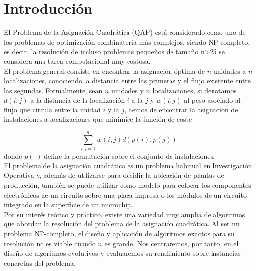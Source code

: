 

\newpage


\section{Introducción}

El Problema de la Asignación Cuadrática (QAP) está considerado como uno de los problemas de optimización combinatoria más complejos, siendo NP-completo, es decir, la resolución de incluso problemas pequeños de tamaño n>25 se considera una tarea computacional muy costosa.\\

El problema general consiste en encontrar la asignación óptima de $n$ unidades a $n$ localizaciones, conociendo la distancia entre las primeras y el flujo existente entre las segundas. Formalmente, sean $n$ unidades y $n$ localizaciones, si denotamos $d(i,j)$ a la distancia de la localización $i$ a la $j$ y $w(i,j)$ al peso asociado al flujo que circula entre la unidad $i$ y la $j$, hemos de encontrar la asignación de instalaciones a localizaciones que minimice la función de coste

$$
	\sum_{i,j=1}^n w(i,j) d(p(i), p(j))
$$
donde $p(\cdot)$ define la permutación sobre el conjunto de instalaciones.\\

El problema de la asignación cuadrática es un problema habitual en Investigación Operativa y, además de utilizarse para decidir la ubicación de plantas de producción, también se puede utilizar como modelo para colocar los componentes electrónicos de un circuito sobre una placa impresa o los módulos de un circuito integrado en la superficie de un microchip.\\

Por su interés teórico y práctico, existe una variedad muy amplia de algoritmos que abordan la resolución del problema de la asignación cuadrática. Al ser un problema NP-completo, el diseño y aplicación de algoritmos exactos para su resolución no es viable cuando $n$ es grande. Nos centraremos, por tanto, en el diseño de algoritmos evolutivos y evaluaremos su rendimiento sobre instancias concretas del problema.

